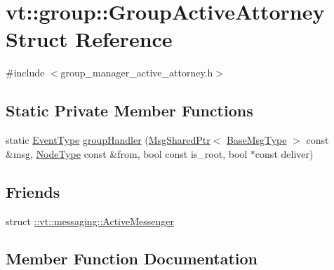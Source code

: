 \hypertarget{structvt_1_1group_1_1_group_active_attorney}{}\section{vt\+:\+:group\+:\+:Group\+Active\+Attorney Struct Reference}
\label{structvt_1_1group_1_1_group_active_attorney}


{\ttfamily \#include $<$group\+\_\+manager\+\_\+active\+\_\+attorney.\+h$>$}

\subsection*{Static Private Member Functions}
\begin{DoxyCompactItemize}
\item 
static \hyperlink{namespacevt_a009267401def7ae8bf201892222d060f}{Event\+Type} \hyperlink{structvt_1_1group_1_1_group_active_attorney_aa450822a67b03b465a1250900f024529}{group\+Handler} (\hyperlink{namespacevt_ab2b3d506ec8e8d1540aede826d84a239}{Msg\+Shared\+Ptr}$<$ \hyperlink{namespacevt_a44d0d4e144748f2b19a1cfd962f50338}{Base\+Msg\+Type} $>$ const \&msg, \hyperlink{namespacevt_a866da9d0efc19c0a1ce79e9e492f47e2}{Node\+Type} const \&from, bool const is\+\_\+root, bool $\ast$const deliver)
\end{DoxyCompactItemize}
\subsection*{Friends}
\begin{DoxyCompactItemize}
\item 
struct \hyperlink{structvt_1_1group_1_1_group_active_attorney_a31cb499e12b002c0912506ddca0efcaa}{\+::vt\+::messaging\+::\+Active\+Messenger}
\end{DoxyCompactItemize}


\subsection{Member Function Documentation}
\mbox{\label{structvt_1_1group_1_1_group_active_attorney_aa450822a67b03b465a1250900f024529}} 
